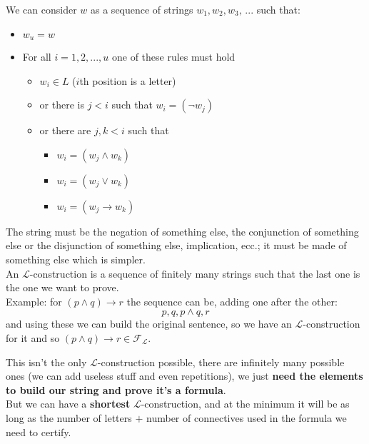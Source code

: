 \documentclass[11pt]{article}
\begin{document}
	We can consider $w$ as a sequence of strings $w_1, w_2, w_3, \, ...$ such that:
	\begin{itemize}
		\item $w_u = w$
		\item For all $i =  1,2, ... , u$ one of these rules must hold
		\begin{itemize}
			\item $w_i \in L$ ($i$th position is a letter) 
			\item or there is $j<i$ such that $w_i = (\neg w_j)$
			\item or there are $j,k < i$ such that
			\begin{itemize}[label=]
				\item $w_i = (w_j \wedge w_k)$
				\item $w_i = (w_j \vee w_k)$
				\item $w_i = (w_j \rightarrow w_k)$
			\end{itemize}
		\end{itemize}
	\end{itemize}
	
	The string must be the negation of something else, the conjunction of something else or the disjunction of something else, implication, ecc.; it must be made of something else which is simpler.\\
	
	An $\mathcal{L}$-construction is a sequence of finitely many strings such that the last one is the one we want to prove. \\
	
	Example: for $(p \wedge q) \rightarrow r$ the sequence can be, adding one after the other: 
	$$ p, q, p \wedge q, r $$
	and using these we can build the original sentence, so we have an $\mathcal{L}$-construction for it and so $(p \wedge q) \rightarrow r \in \mathcal{F}_{\mathcal{L}}$.\\
	
	\newpage
	
	This isn't the only $\mathcal{L}$-construction possible, there are infinitely many possible ones (we can add useless stuff and even repetitions), we just \textbf{need the elements to build our string and prove it's a formula}. \\
	
	But we can have a \textbf{shortest} $\mathcal{L}$-construction, and at the minimum it will be as long as the number of letters $+$ number of connectives used in the formula we need to certify.\\
	
\end{document}
